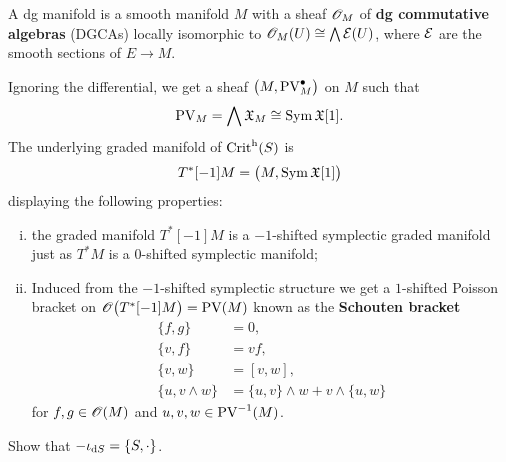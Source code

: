 \begin{definition}
  A dg manifold is a smooth manifold $M$ with a sheaf $\mathscr{O}_M$ of \textbf{dg commutative algebras} (DGCAs) locally isomorphic to $\mathscr{O}_M(U) \cong \bigwedge \mathcal{E} (U)$, where $\mathcal{E}$ are the smooth sections of $E \rightarrow M$.
\end{definition}

Ignoring the differential, we get a sheaf $\bigl(M, \operatorname{PV}_M^\bullet\bigr)$ on $M$ such that
\begin{equation*}
  \operatorname{PV}_M = \bigwedge \mathfrak{X}_M \cong \operatorname{Sym} \mathfrak{X}[1].
\end{equation*}
The underlying graded manifold of $\operatorname{Crit}^{\mathrm{h}}(S)$ is
\begin{equation*}
  T^*[-1]M = \bigl( M, \operatorname{Sym} \mathfrak{X}[1] \bigr)
\end{equation*}
displaying the following properties:
\begin{enumerate}[i)]
  \item the graded manifold $T^*[-1]M$ is a $-1$-shifted symplectic graded manifold just as $T^*M$ is a $0$-shifted symplectic manifold;
  \item Induced from the $-1$-shifted symplectic structure we get a $1$-shifted Poisson bracket on $\mathscr{O} \bigl( T^* [-1] M \bigr) = \operatorname{PV}(M)$ known as the \textbf{Schouten bracket}
  \begin{align*}
    \{ f, g \} &= 0, \\
    \{v, f \} &= v f, \\
    \{ v, w \} &= [v, w], \\
    \{u, v \wedge w \} &= \{u, v\} \wedge w + v \wedge \{ u, w \}
  \end{align*}
for $f, g \in \mathscr{O}(M)$ and $u, v, w \in \operatorname{PV}^{-1}(M)$.
\end{enumerate}

\begin{exercise}
  Show that $-\iota_{\mathrm{d} S} = \{ S, \cdot \}$.
\end{exercise}

